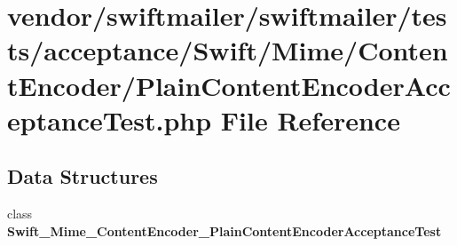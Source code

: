 \section{vendor/swiftmailer/swiftmailer/tests/acceptance/\+Swift/\+Mime/\+Content\+Encoder/\+Plain\+Content\+Encoder\+Acceptance\+Test.php File Reference}
\label{_plain_content_encoder_acceptance_test_8php}
\subsection*{Data Structures}
\begin{DoxyCompactItemize}
\item 
class {\bf Swift\+\_\+\+Mime\+\_\+\+Content\+Encoder\+\_\+\+Plain\+Content\+Encoder\+Acceptance\+Test}
\end{DoxyCompactItemize}
